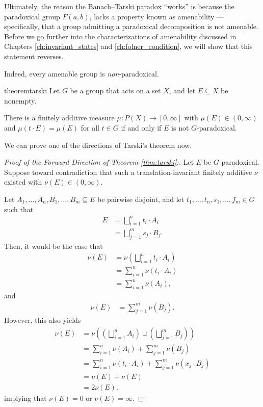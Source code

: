 Ultimately, the reason the Banach--Tarski paradox ``works'' is because the paradoxical group $F(a,b)$, lacks a property known as amenability --- specifically, that a group admitting a paradoxical decomposition is not amenable. Before we go further into the characterizations of amenability discussed in Chapters \ref{ch:invariant_states} and \ref{ch:folner_condition}, we will show that this statement reverses.\newline

Indeed, every amenable group is \textit{non}-paradoxical.
\begin{restatable}{theorem}{tarski}
  Let $G$ be a group that acts on a set $X$, and let $E \subseteq X$ be nonempty.\newline

  There is a finitely additive measure $\mu \colon P(X) \to [0, \infty]$ with $\mu(E) \in (0, \infty)$ and $\mu\left( t\cdot E \right) = \mu(E)$ for all $t\in G$ if and only if $E$ is not $G$-paradoxical.
\label{thm:tarski}
\end{restatable}
We can prove one of the directions of Tarski's theorem now.
\begin{proof}[Proof of the Forward Direction of Theorem \ref{thm:tarski}:]
  Let $E$ be $G$-paradoxical. Suppose toward contradiction that such a translation-invariant finitely additive $\nu$ existed with $\nu(E) \in (0,\infty)$.\newline

  Let $A_1,\dots,A_n,B_1,\dots,B_m\subseteq E$ be pairwise disjoint, and let $t_1,\dots,t_n,s_1,\dots,f_m\in G$ such that
  \begin{align*}
    E &= \bigsqcup_{i=1}^{n}t_i\cdot A_i\\
      &= \bigsqcup_{j=1}^{m}s_j\cdot B_j.
  \end{align*}
  Then, it would be the case that
  \begin{align*}
    \nu(E) &= \nu\left(\bigsqcup_{i=1}^{n}t_i\cdot A_i\right)\\
           &= \sum_{i=1}^{n}\nu\left(t_i\cdot A_i\right)\\
           &= \sum_{i=1}^{n}\nu\left(A_i\right),
  \end{align*}
  and
  \begin{align*}
    \nu(E) &= \sum_{j=1}^{m}\nu\left(B_j\right).
  \end{align*}
  However, this also yields
  \begin{align*}
    \nu\left(E\right) &= \nu\left(\left(\bigsqcup_{i=1}^{n}A_i\right)\sqcup \left(\bigsqcup_{j=1}^{m}B_j\right)\right)\\
                      &= \sum_{i=1}^{n}\nu\left(A_i\right) + \sum_{j=1}^{m}\nu\left(B_j\right)\\
                      &= \sum_{i=1}^{n}\nu\left(t_i\cdot A_i\right) + \sum_{j=1}^{m}\nu\left(x_j\cdot B_j\right)\\
                      &= \nu\left(E\right) + \nu\left(E\right)\\
                      &= 2\nu\left(E\right).
  \end{align*}
  implying that $\nu(E) = 0$ or $\nu(E) = \infty$.
\end{proof}

